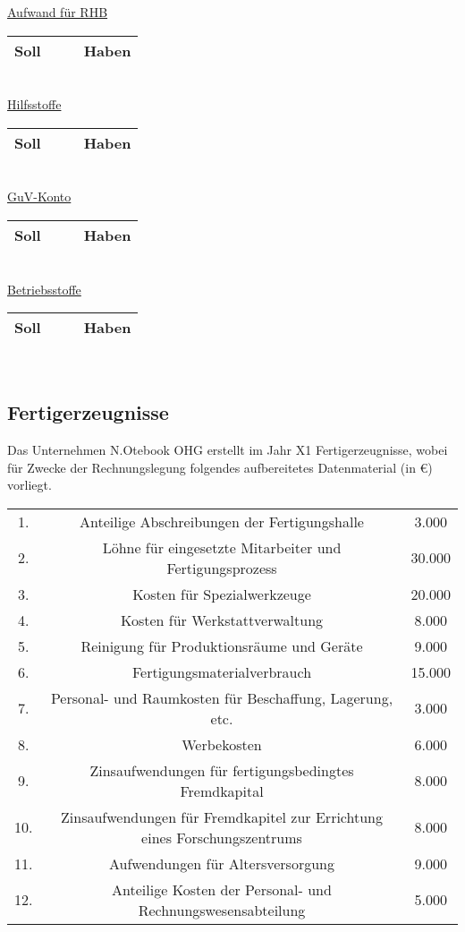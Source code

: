 \documentclass[paper=a4, fontsize=11pt]{scrartcl}
\numberwithin{equation}{section}
\numberwithin{figure}{section}
\numberwithin{table}{section}
\begin{document}
{\underline{Aufwand für RHB}

\begin{tabular}{cc|cc}
\hline
Soll & & & Haben \\
\hline
\end{tabular}
\\

\underline{Hilfsstoffe}

\begin{tabular}{cc|cc}
\hline
Soll & & & Haben \\
\hline
\end{tabular}
\\

\underline{GuV-Konto}

\begin{tabular}{cc|cc}
\hline
Soll & & & Haben \\
\hline
\end{tabular}
\\

\underline{Betriebsstoffe}

\begin{tabular}{cc|cc}
\hline
Soll & & & Haben \\
\hline
\end{tabular}
\\

\subsection{Fertigerzeugnisse}
Das Unternehmen N.Otebook OHG erstellt im Jahr X1 Fertigerzeugnisse, wobei für Zwecke der Rechnungslegung folgendes aufbereitetes Datenmaterial (in €) vorliegt. \\
\begin{tabular}{ccc}
1. & Anteilige Abschreibungen der Fertigungshalle & 3.000 \\
2. & Löhne für eingesetzte Mitarbeiter und Fertigungsprozess & 30.000 \\
3. & Kosten für Spezialwerkzeuge & 20.000 \\
4. & Kosten für Werkstattverwaltung & 8.000 \\
5. & Reinigung für Produktionsräume und Geräte & 9.000 \\
6. & Fertigungsmaterialverbrauch & 15.000 \\
7. & Personal- und Raumkosten für Beschaffung, Lagerung, etc.  & 3.000 \\
8. & Werbekosten & 6.000 \\
9. & Zinsaufwendungen für fertigungsbedingtes Fremdkapital & 8.000 \\
10. & Zinsaufwendungen für Fremdkapitel zur Errichtung eines Forschungszentrums & 8.000 \\
11. & Aufwendungen für Altersversorgung & 9.000 \\
12. & Anteilige Kosten der Personal- und Rechnungswesensabteilung & 5.000 \\
\end{tabular}

}
\end{document}

